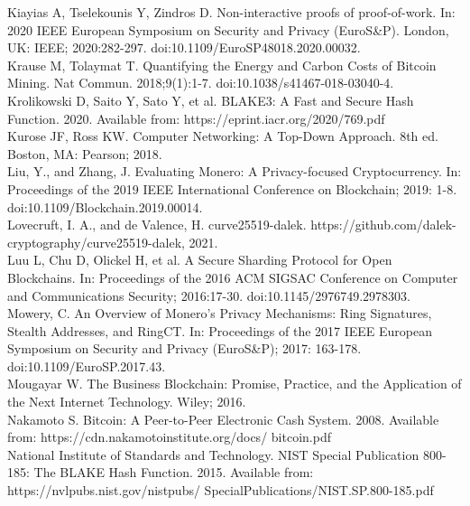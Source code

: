 \documentclass[10pt,a4paper,twocolumn]{article}
\begin{document}
Kiayias A, Tselekounis Y, Zindros D. Non-interactive proofs of proof-of-work. In: 2020 IEEE European Symposium on Security and Privacy (EuroS\&P). London, UK: IEEE; 2020:282-297. doi:10.1109/EuroSP48018.2020.00032.\\

Krause M, Tolaymat T. Quantifying the Energy and Carbon Costs of Bitcoin Mining. Nat Commun. 2018;9(1):1-7. doi:10.1038/s41467-018-03040-4.\\

Krolikowski D, Saito Y, Sato Y, et al. BLAKE3: A Fast and Secure Hash Function. 2020. Available from: https://eprint.iacr.org/2020/769.pdf\\

Kurose JF, Ross KW. Computer Networking: A Top-Down Approach. 8th ed. Boston, MA: Pearson; 2018.\\

Liu, Y., and Zhang, J. Evaluating Monero: A Privacy-focused Cryptocurrency. In: Proceedings of the 2019 IEEE International Conference on Blockchain; 2019: 1-8. doi:10.1109/Blockchain.2019.00014.\\

Lovecruft, I. A., and de Valence, H. curve25519-dalek. https://github.com/dalek-cryptography/curve25519-dalek, 2021.\\

Luu L, Chu D, Olickel H, et al. A Secure Sharding Protocol for Open Blockchains. In: Proceedings of the 2016 ACM SIGSAC Conference on Computer and Communications Security; 2016:17-30. doi:10.1145/2976749.2978303.\\

Mowery, C. An Overview of Monero's Privacy Mechanisms: Ring Signatures, Stealth Addresses, and RingCT. In: Proceedings of the 2017 IEEE European Symposium on Security and Privacy (EuroS\&P); 2017: 163-178. doi:10.1109/EuroSP.2017.43.\\

Mougayar W. The Business Blockchain: Promise, Practice, and the Application of the Next Internet Technology. Wiley; 2016.\\

Nakamoto S. Bitcoin: A Peer-to-Peer Electronic Cash System. 2008. Available from: https://cdn.nakamotoinstitute.org/docs/ bitcoin.pdf \\

National Institute of Standards and Technology. NIST Special Publication 800-185: The BLAKE Hash Function. 2015. Available from: https://nvlpubs.nist.gov/nistpubs/ SpecialPublications/NIST.SP.800-185.pdf \\
\end{document}
